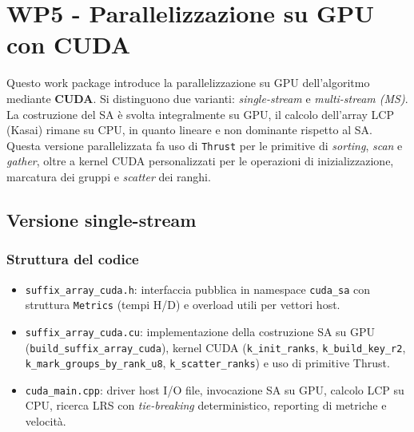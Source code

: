 \chapter{WP5 - Parallelizzazione su GPU con CUDA}
	
	Questo work package introduce la parallelizzazione su GPU dell'algoritmo mediante \textbf{CUDA}.
	Si distinguono due varianti: \emph{single-stream} e \emph{multi-stream (MS)}.
	La costruzione del SA è svolta integralmente su GPU, il calcolo dell'array LCP (Kasai) rimane su CPU, in quanto lineare e non dominante rispetto al SA\@.
	Questa versione parallelizzata fa uso di \texttt{Thrust} per le primitive di \emph{sorting}, \emph{scan} e \emph{gather}, oltre a kernel CUDA personalizzati per le operazioni di inizializzazione, marcatura dei gruppi e \emph{scatter} dei ranghi.
	
	\section{Versione single-stream}
		
		\subsection{Struttura del codice}
			\begin{itemize}
				\item \texttt{suffix\_array\_cuda.h}: interfaccia pubblica in namespace \texttt{cuda\_sa} con struttura \texttt{Metrics} (tempi H/D) e overload utili per vettori host.
				\item \texttt{suffix\_array\_cuda.cu}: implementazione della costruzione SA su GPU (\texttt{build\_suffix\_array\_cuda}), kernel CUDA (\texttt{k\_init\_ranks}, \texttt{k\_build\_key\_r2}, \texttt{k\_mark\_groups\_by\_rank\_u8}, \texttt{k\_scatter\_ranks}) e uso di primitive Thrust.
				\item \texttt{cuda\_main.cpp}: driver host I/O file, invocazione SA su GPU, calcolo LCP su CPU, ricerca LRS con \emph{tie-breaking} deterministico, reporting di metriche e velocità.
			\end{itemize}
		
